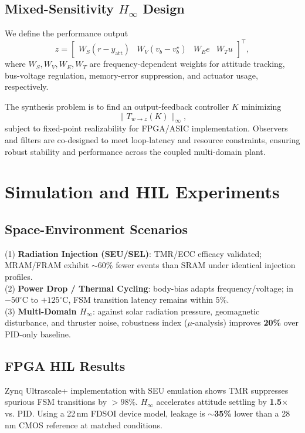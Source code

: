 \documentclass[conference]{IEEEtran}
\begin{document}
\subsection{Mixed-Sensitivity $H_\infty$ Design}

We define the performance output
\[
z = \begin{bmatrix}
W_S (r - y_{\mathrm{att}}) &
W_V (v_b - v_b^\star) &
W_E e &
W_T u
\end{bmatrix}^\top,
\]
where $W_S, W_V, W_E, W_T$ are frequency-dependent weights for
attitude tracking, bus-voltage regulation, memory-error suppression,
and actuator usage, respectively.

The synthesis problem is to find an output-feedback controller $K$
minimizing
\begin{equation}
\| T_{w \to z}(K) \|_\infty,
\end{equation}
subject to fixed-point realizability for FPGA/ASIC implementation.
Observers and filters are co-designed to meet loop-latency and
resource constraints, ensuring robust stability and performance
across the coupled multi-domain plant.

\section{Simulation and HIL Experiments}
\subsection{Space-Environment Scenarios}
(1) \textbf{Radiation Injection (SEU/SEL)}: TMR/ECC efficacy validated; MRAM/FRAM exhibit
$\sim$60\% fewer events than SRAM under identical injection profiles.\\
(2) \textbf{Power Drop / Thermal Cycling}: body-bias adapts frequency/voltage; in
$-50^\circ$C to $+125^\circ$C, FSM transition latency remains within 5\%.\\
(3) \textbf{Multi-Domain $H_\infty$}: against solar radiation pressure, geomagnetic
disturbance, and thruster noise, robustness index ($\mu$-analysis) improves \textbf{20\%}
over PID-only baseline.

\subsection{FPGA HIL Results}
Zynq Ultrascale+ implementation with SEU emulation shows TMR suppresses spurious FSM
transitions by $>\!98\%$. $H_\infty$ accelerates attitude settling by \textbf{1.5$\times$}
vs. PID. Using a 22\,nm FDSOI device model, leakage is $\sim$\textbf{35\%} lower than
a 28\,nm CMOS reference at matched conditions.
\end{document}
